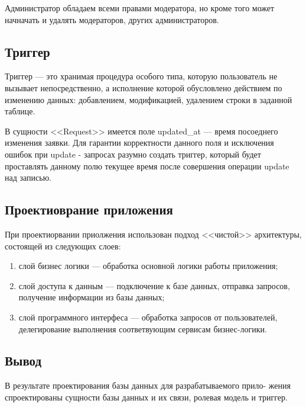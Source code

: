Администратор обладаем всеми правами модератора, но кроме того может начначать и удалять модераторов, других администраторов.

\subsection{Триггер}

Триггер — это хранимая процедура особого типа, которую пользователь не вызывает непосредственно, а исполнение которой обусловлено действием по изменению данных: добавлением, модификацией, удалением строки в заданной таблице.

В сущности <<Request>> имеется поле updated{\_}at --- время посоеднего изменения заявки. Для гарантии корректности данного поля и исключения ошибок при update - запросах разумно создать триггер, который будет проставлять данному полю текущее время после совершения операции update над записью.

\subsection{Проектиоврание приложения}

При проектиорвании приолжения использован подход <<чистой>>\cite{clean-code} архитектуры, состоящей из следующих слоев:
\begin{enumerate}
	\item слой бизнес логики --- обработка основной логики работы приложения;
	\item слой доступа к данным --- подключение к базе данных, отправка запросов, получение информации из базы данных;
	\item слой программного интерфеса --- обработка запросов от пользователей, делегирование выполнения соответвующим сервисам бизнес-логики.
\end{enumerate}

\subsection{Вывод}

В результате проектирования базы данных для разрабатываемого прило-
жения спроектированы сущности базы данных и их связи, ролевая модель и триггер.

\pagebreak
